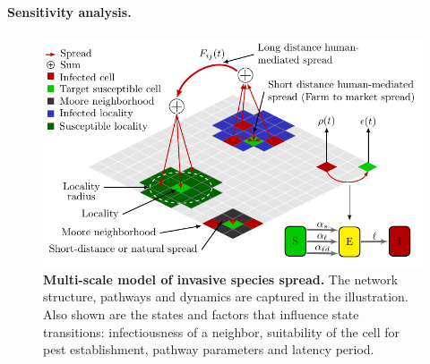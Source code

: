 \documentclass{article}
\begin{document}
\paragraph{Sensitivity analysis.}
\begin{figure}[t]
\centering
\includegraphics[width=\columnwidth]{figs/model_schematic.pdf}
\caption{\textbf{Multi-scale model of invasive species spread.} The
network structure, pathways and dynamics are captured in the illustration.
Also shown are the states and factors that influence state transitions:
infectiousness of a neighbor, suitability of the cell for pest
establishment, pathway parameters and latency period.
\label{fig:modelConcept}}
\end{figure}
\end{document}
